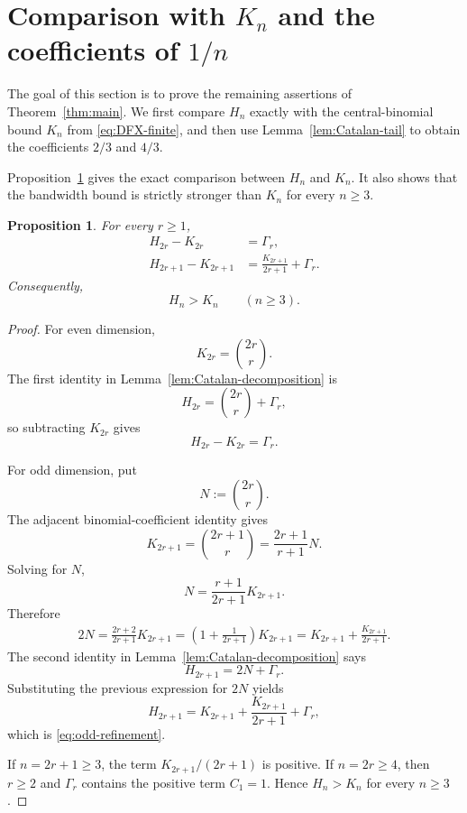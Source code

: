 \documentclass[10pt]{amsart}
\newtheorem{proposition}[theorem]{Proposition}
\numberwithin{equation}{section}
\begin{document}
\section{Comparison with \texorpdfstring{$K_n$}{K n} and the coefficients of \texorpdfstring{$1/n$}{1/n}}\label{sec:asymptotics}

The goal of this section is to prove the remaining assertions of
Theorem~\ref{thm:main}.  We first compare $H_n$ exactly with the central-binomial
bound $K_n$ from \cref{eq:DFX-finite}, and then use
Lemma~\ref{lem:Catalan-tail} to obtain the coefficients $2/3$ and $4/3$.

Proposition~\ref{prop:finite-refinement} gives the exact comparison between $H_n$ and
$K_n$.  It also shows that the bandwidth bound is strictly stronger than
$K_n$ for every $n\ge3$.

\begin{proposition}\label{prop:finite-refinement}
For every $r\ge1$,
\begin{align}
 H_{2r}-K_{2r}&=\Gamma_r,
 \label{eq:even-refinement}\\
 H_{2r+1}-K_{2r+1}
 &=\frac{K_{2r+1}}{2r+1}+\Gamma_r.
 \label{eq:odd-refinement}
\end{align}
Consequently,
\[
 H_n>K_n\qquad(n\ge3).
\]
\end{proposition}

\begin{proof}
For even dimension,
\[
 K_{2r}=\binom{2r}{r}.
\]
The first identity in Lemma~\ref{lem:Catalan-decomposition} is
\[
 H_{2r}=\binom{2r}{r}+\Gamma_r,
\]
so subtracting $K_{2r}$ gives
\[
 H_{2r}-K_{2r}=\Gamma_r.
\]

For odd dimension, put
\[
 N:=\binom{2r}{r}.
\]
The adjacent binomial-coefficient identity gives
\[
 K_{2r+1}=\binom{2r+1}{r}
 =\frac{2r+1}{r+1}N.
\]
Solving for $N$,
\[
 N=\frac{r+1}{2r+1}K_{2r+1}.
\]
Therefore
\begin{align*}
 2N
 =\frac{2r+2}{2r+1}K_{2r+1}
 =\left(1+\frac{1}{2r+1}\right)K_{2r+1}
 =K_{2r+1}+\frac{K_{2r+1}}{2r+1}.
\end{align*}
The second identity in Lemma~\ref{lem:Catalan-decomposition} says
\[
 H_{2r+1}=2N+\Gamma_r.
\]
Substituting the previous expression for $2N$ yields
\[
 H_{2r+1}
 =K_{2r+1}+\frac{K_{2r+1}}{2r+1}+\Gamma_r,
\]
which is \cref{eq:odd-refinement}.

If $n=2r+1\ge3$, the term $K_{2r+1}/(2r+1)$ is positive.  If
$n=2r\ge4$, then $r\ge2$ and $\Gamma_r$ contains the positive term
$C_1=1$.  Hence $H_n>K_n$ for every $n\ge3$.
\end{proof}
\end{document}
